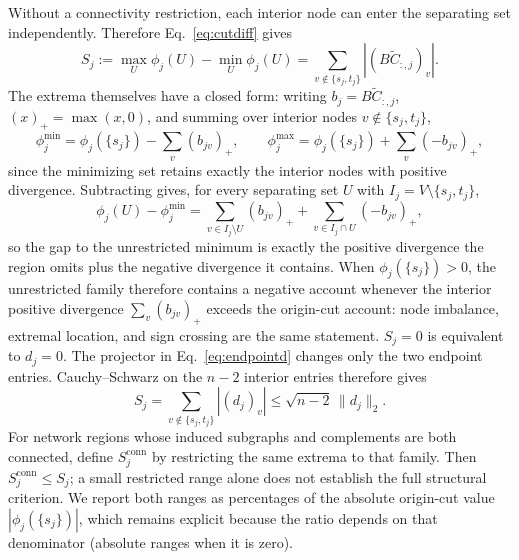 \documentclass[a4paper,fleqn]{cas-sc}
\newcommand{\norm}[1]{\lVert #1 \rVert}
\begin{document}
Without a connectivity restriction, each interior node can enter the
separating set independently. Therefore Eq.~\eqref{eq:cutdiff} gives
\begin{equation}
S_j:=\max_U\phi_j(U)-\min_U\phi_j(U)
=\sum_{v\notin\{s_j,t_j\}}|(B\widetilde C_{:,j})_v|.
\label{eq:cutspread}
\end{equation}
The extrema themselves have a closed form: writing $b_j=B\widetilde
C_{:,j}$, $(x)_+=\max(x,0)$, and summing over interior nodes
$v\notin\{s_j,t_j\}$,
\begin{equation}
\phi_j^{\min}=\phi_j(\{s_j\})-\sum_v(b_{jv})_+,
\qquad
\phi_j^{\max}=\phi_j(\{s_j\})+\sum_v(-b_{jv})_+,
\label{eq:cutextrema}
\end{equation}
since the minimizing set retains exactly the interior nodes with
positive divergence. Subtracting gives, for every separating set $U$
with $I_j=V\setminus\{s_j,t_j\}$,
\begin{equation}
\phi_j(U)-\phi_j^{\min}
=\sum_{v\in I_j\setminus U}(b_{jv})_+
+\sum_{v\in I_j\cap U}(-b_{jv})_+,
\label{eq:cutgap}
\end{equation}
so the gap to the unrestricted minimum is exactly the positive
divergence the region omits plus the negative divergence it contains.
When $\phi_j(\{s_j\})>0$, the unrestricted family
therefore contains a negative account whenever the interior positive
divergence $\sum_v(b_{jv})_+$ exceeds the origin-cut account: node
imbalance, extremal location, and sign crossing are the same statement.
$S_j=0$ is equivalent to $d_j=0$.
The projector in Eq.~\eqref{eq:endpointd} changes only the two endpoint
entries. Cauchy--Schwarz on the $n-2$ interior entries therefore gives
\begin{equation}
S_j=\sum_{v\notin\{s_j,t_j\}}|(d_j)_v|
\le\sqrt{n-2}\,\norm{d_j}_2.
\label{eq:rangebound}
\end{equation}
For network regions whose induced subgraphs and complements are both
connected, define $S_j^{\mathrm{conn}}$ by restricting the same extrema to
that family. Then $S_j^{\mathrm{conn}}\le S_j$; a small restricted range
alone does not establish the full structural criterion. We report both
ranges as percentages of the absolute origin-cut value
$|\phi_j(\{s_j\})|$, which remains explicit because the ratio depends
on that denominator (absolute ranges when it is zero).
\end{document}
